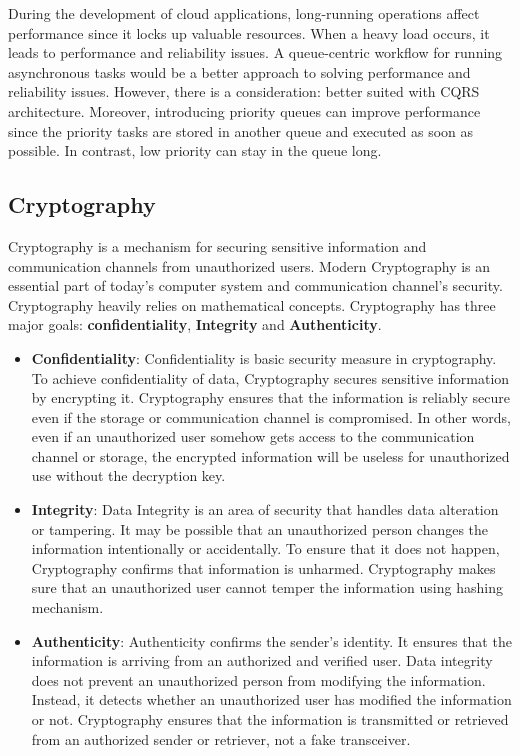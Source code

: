 \documentclass[12pt,a4paper]{article}
\begin{document}
During the development of cloud applications, long-running operations affect performance since it locks up valuable resources. When a heavy load occurs, it leads to performance and reliability issues. A queue-centric workflow for running asynchronous tasks would be a better approach to solving performance and reliability issues. However, there is a consideration: better suited with CQRS architecture. Moreover, introducing priority queues can improve performance since the priority tasks are stored in another queue and executed as soon as possible. In contrast, low priority can stay in the queue long.\cite{r25}

\subsection{Cryptography}
Cryptography is a mechanism for securing sensitive information and communication channels from unauthorized users. \cite{r24} Modern Cryptography is an essential part of today's computer system and communication channel's security. Cryptography heavily relies on mathematical concepts. \cite{r23} Cryptography has three major goals: \textbf{confidentiality}, \textbf{Integrity} and \textbf{Authenticity}. \cite{r24}

\begin{itemize}

\item \textbf{Confidentiality}: Confidentiality is basic security measure in cryptography.\cite{r23} To achieve confidentiality of data, Cryptography secures sensitive information by encrypting it. Cryptography ensures that the information is reliably secure even if the storage or communication channel is compromised. In other words, even if an unauthorized user somehow gets access to the communication channel or storage, the encrypted information will be useless for unauthorized use without the decryption key. \cite{r24}

\item \textbf{Integrity}: Data Integrity is an area of security that handles data alteration or tampering. It may be possible that an unauthorized person changes the information intentionally or accidentally. To ensure that it does not happen, Cryptography confirms that information is unharmed. \cite{r23} Cryptography makes sure that an unauthorized user cannot temper the information using hashing mechanism. \cite{r24}

\item \textbf{Authenticity}: Authenticity confirms the sender's identity. It ensures that the information is arriving from an authorized and verified user. Data integrity does not prevent an unauthorized person from modifying the information. Instead, it detects whether an unauthorized user has modified the information or not.\cite{r23} Cryptography ensures that the information is transmitted or retrieved from an authorized sender or retriever, not a fake transceiver. \cite{r24}

\end{itemize}
\end{document}
